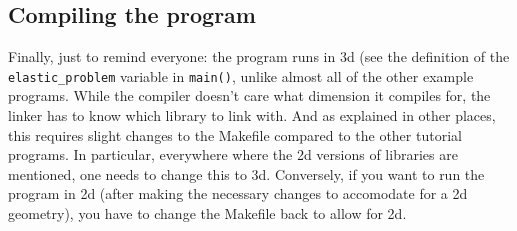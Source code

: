 \documentclass{article}
\begin{document}
\subsection*{Compiling the program}

Finally, just to remind everyone: the program runs in 3d (see the definition
of the \texttt{elastic\_problem} variable in \texttt{main()}, unlike almost all
of the other example programs. While the compiler doesn't care what dimension
it compiles for, the linker has to know which library to link with. And as
explained in other places, this requires slight changes to the Makefile
compared to the other tutorial programs. In particular, everywhere where the
2d versions of libraries are mentioned, one needs to change this to
3d. Conversely, if you want to run the program in 2d (after making the
necessary changes to accomodate for a 2d geometry), you have to change the
Makefile back to allow for 2d.
\end{document}
